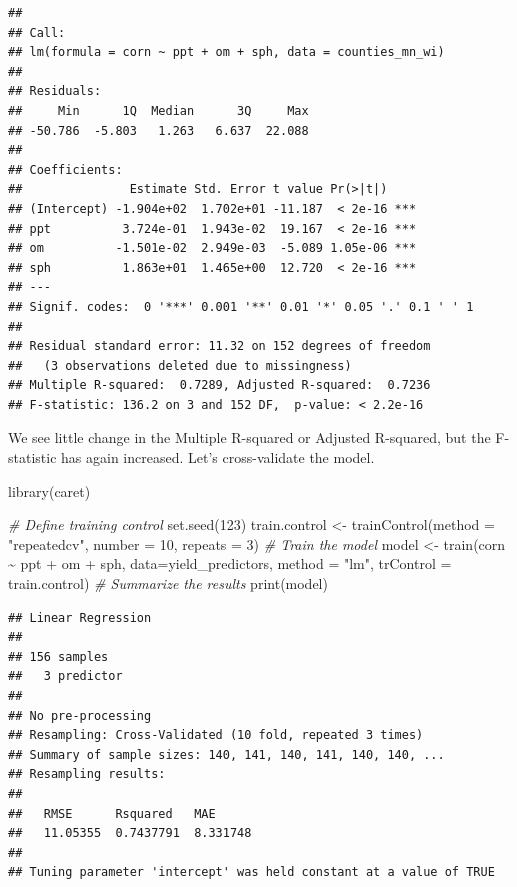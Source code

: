 \documentclass[
]{book}
\newenvironment{Shaded}{\begin{snugshade}}{\end{snugshade}}
\newcommand{\AttributeTok}[1]{\textcolor[rgb]{0.77,0.63,0.00}{#1}}
\newcommand{\CommentTok}[1]{\textcolor[rgb]{0.56,0.35,0.01}{\textit{#1}}}
\newcommand{\DecValTok}[1]{\textcolor[rgb]{0.00,0.00,0.81}{#1}}
\newcommand{\FunctionTok}[1]{\textcolor[rgb]{0.00,0.00,0.00}{#1}}
\newcommand{\NormalTok}[1]{#1}
\newcommand{\OtherTok}[1]{\textcolor[rgb]{0.56,0.35,0.01}{#1}}
\newcommand{\SpecialCharTok}[1]{\textcolor[rgb]{0.00,0.00,0.00}{#1}}
\newcommand{\StringTok}[1]{\textcolor[rgb]{0.31,0.60,0.02}{#1}}
\begin{document}
\begin{verbatim}
## 
## Call:
## lm(formula = corn ~ ppt + om + sph, data = counties_mn_wi)
## 
## Residuals:
##     Min      1Q  Median      3Q     Max 
## -50.786  -5.803   1.263   6.637  22.088 
## 
## Coefficients:
##               Estimate Std. Error t value Pr(>|t|)    
## (Intercept) -1.904e+02  1.702e+01 -11.187  < 2e-16 ***
## ppt          3.724e-01  1.943e-02  19.167  < 2e-16 ***
## om          -1.501e-02  2.949e-03  -5.089 1.05e-06 ***
## sph          1.863e+01  1.465e+00  12.720  < 2e-16 ***
## ---
## Signif. codes:  0 '***' 0.001 '**' 0.01 '*' 0.05 '.' 0.1 ' ' 1
## 
## Residual standard error: 11.32 on 152 degrees of freedom
##   (3 observations deleted due to missingness)
## Multiple R-squared:  0.7289, Adjusted R-squared:  0.7236 
## F-statistic: 136.2 on 3 and 152 DF,  p-value: < 2.2e-16
\end{verbatim}

We see little change in the Multiple R-squared or Adjusted R-squared, but the F-statistic has again increased. Let's cross-validate the model.

\begin{Shaded}
\begin{Highlighting}[]
\FunctionTok{library}\NormalTok{(caret)}

\CommentTok{\# Define training control}
\FunctionTok{set.seed}\NormalTok{(}\DecValTok{123}\NormalTok{)}
\NormalTok{train.control }\OtherTok{\textless{}{-}} \FunctionTok{trainControl}\NormalTok{(}\AttributeTok{method =} \StringTok{"repeatedcv"}\NormalTok{, }
                              \AttributeTok{number =} \DecValTok{10}\NormalTok{, }\AttributeTok{repeats =} \DecValTok{3}\NormalTok{)}
\CommentTok{\# Train the model}
\NormalTok{model }\OtherTok{\textless{}{-}} \FunctionTok{train}\NormalTok{(corn }\SpecialCharTok{\textasciitilde{}}\NormalTok{ ppt }\SpecialCharTok{+}\NormalTok{ om }\SpecialCharTok{+}\NormalTok{ sph, }\AttributeTok{data=}\NormalTok{yield\_predictors, }\AttributeTok{method =} \StringTok{"lm"}\NormalTok{,}
               \AttributeTok{trControl =}\NormalTok{ train.control)}
\CommentTok{\# Summarize the results}
\FunctionTok{print}\NormalTok{(model)}
\end{Highlighting}
\end{Shaded}

\begin{verbatim}
## Linear Regression 
## 
## 156 samples
##   3 predictor
## 
## No pre-processing
## Resampling: Cross-Validated (10 fold, repeated 3 times) 
## Summary of sample sizes: 140, 141, 140, 141, 140, 140, ... 
## Resampling results:
## 
##   RMSE      Rsquared   MAE     
##   11.05355  0.7437791  8.331748
## 
## Tuning parameter 'intercept' was held constant at a value of TRUE
\end{verbatim}
\end{document}
